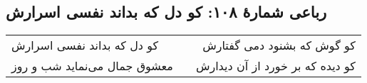 \begin{center}
\section*{رباعی شمارهٔ ۱۰۸: کو دل که بداند نفسی اسرارش }
\label{sec:108}
\begin{longtable}{l p{0.5cm} r}
کو دل که بداند نفسی اسرارش 
&&
کو گوش که بشنود دمی گفتارش
\\
معشوق جمال می‌نماید شب و روز
&&
کو دیده که بر خورد از آن دیدارش
\\
\end{longtable}
\end{center}
